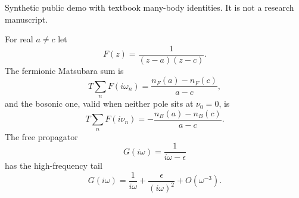 \documentclass{article}
\begin{document}
Synthetic public demo with textbook many-body identities. It is not a
research manuscript.

For real $a\neq c$ let
\begin{equation}
\label{eq:summand}
F(z) = \frac{1}{(z-a)(z-c)} .
\end{equation}
The fermionic Matsubara sum is
\begin{equation}
\label{eq:fermion}
T\sum_n F(i\omega_n) = \frac{n_F(a)-n_F(c)}{a-c},
\end{equation}
and the bosonic one, valid when neither pole sits at $\nu_0=0$, is
\begin{equation}
\label{eq:boson}
T\sum_n F(i\nu_n) = -\frac{n_B(a)-n_B(c)}{a-c}.
\end{equation}
The free propagator
\begin{equation}
\label{eq:green}
G(i\omega) = \frac{1}{i\omega-\epsilon}
\end{equation}
has the high-frequency tail
\begin{equation}
\label{eq:tail}
G(i\omega) = \frac{1}{i\omega} + \frac{\epsilon}{(i\omega)^2} + O(\omega^{-3}).
\end{equation}
\end{document}
